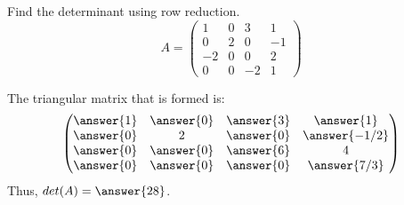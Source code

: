 \documentclass{ximera}
\author{Parisa Fatheddin}
\begin{document}
\begin{exercise}



Find the determinant using row reduction.
\[
A = \begin{pmatrix}
1 & 0 & 3 & 1\\
0 & 2 & 0 & -1 \\
-2 & 0 & 0 & 2\\
0 & 0 & -2 & 1
\end{pmatrix}
\]

\begin{prompt}
The triangular matrix that is formed is:
\[
\begin{pmatrix}
\answer{1} & \answer{0} & \answer{3} & \answer{1}\\
\answer{0} & 2& \answer{0} & \answer{-1/2}\\
\answer{0} & \answer{0} & \answer{6} & 4\\
\answer{0} & \answer{0} & \answer{0} & \answer{7/3}
\end{pmatrix}
\]
Thus, $det(A) = \answer{28}$.
\end{prompt} 













\end{exercise}
\end{document}
